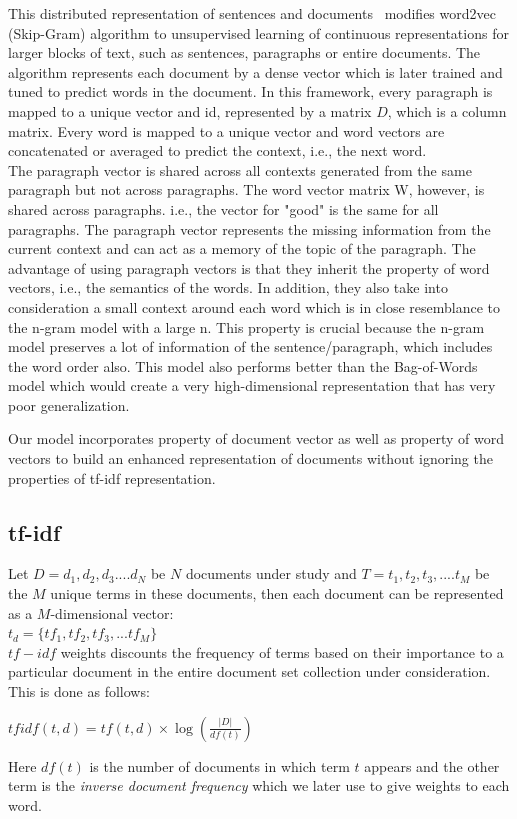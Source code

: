 \documentclass[11pt,a4paper]{article}
\begin{document}
This distributed representation of sentences and documents~\cite{Le:14} modifies word2vec (Skip-Gram) algorithm to unsupervised learning of continuous representations for larger blocks of text, such as sentences, paragraphs or entire documents. The algorithm represents each document by a dense vector which is later trained and tuned to predict words in the document. In this framework, every paragraph is mapped to a unique vector and id, represented by a matrix $D$, which is a column matrix. Every word is mapped to a unique vector and word vectors are concatenated or averaged to predict the context, i.e., the next word.\\
The paragraph vector is shared across all contexts generated from the same paragraph but not across paragraphs. The word vector matrix W, however, is shared across paragraphs. i.e., the vector for "good" is the same for all paragraphs. The paragraph vector represents the missing information from the current context and can act as a memory of the topic of the paragraph. The advantage of using paragraph vectors is that they inherit the property of word vectors, i.e., the semantics of the words. In addition, they also take into consideration a small context around each word which is in close resemblance to the n-gram model with a large n. This property is crucial because the n-gram model preserves a lot of information of the sentence/paragraph, which includes the word order also. This model also performs better than the Bag-of-Words model which would create a very high-dimensional representation that has very poor generalization.

Our model incorporates property of document vector as well as property of word vectors to build an enhanced representation of documents without ignoring the properties of tf-idf representation.

\subsection{tf-idf}
\label{subsec:tfidf}
Let $D=d_1, d_2, d_3....d_N$ be $N$ documents under study and $T=t_1, t_2, t_3,....t_M$ be the $M$ unique terms in these documents, then each document can be represented as a $M$-dimensional vector:\\
$t_d=\{tf_1,tf_2,tf_3,...tf_M\}$\\
$tf-idf$ weights discounts the frequency of terms based on their importance to a particular document in the entire document set collection under consideration. This is done as follows:
\begin{center}
$tfidf(t,d)=tf(t,d) \times \log(\frac{|D|}{df(t)})$ 
\end{center}
Here $df(t)$ is the number of documents in which term $t$ appears and the other term is the \emph{inverse document frequency} which we later use to give weights to each word.
\end{document}
